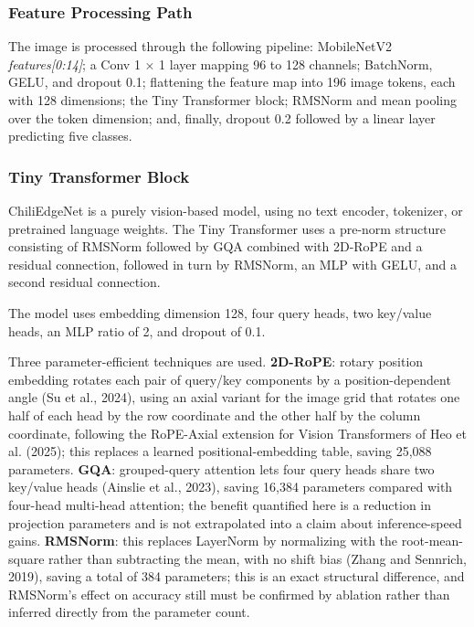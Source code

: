 \subsubsection{Feature Processing Path}\label{feature-processing-path}

The image is processed through the following pipeline: MobileNetV2 \emph{features{[}0:14{]}}; a Conv 1 × 1 layer mapping 96 to 128 channels; BatchNorm, GELU, and dropout 0.1; flattening the feature map into 196 image tokens, each with 128 dimensions; the Tiny Transformer block; RMSNorm and mean pooling over the token dimension; and, finally, dropout 0.2 followed by a linear layer predicting five classes.

\subsubsection{Tiny Transformer Block}\label{tiny-transformer-block}

ChiliEdgeNet is a purely vision-based model, using no text encoder, tokenizer, or pretrained language weights. The Tiny Transformer uses a pre-norm structure consisting of RMSNorm followed by GQA combined with 2D-RoPE and a residual connection, followed in turn by RMSNorm, an MLP with GELU, and a second residual connection.

The model uses embedding dimension 128, four query heads, two key/value heads, an MLP ratio of 2, and dropout of 0.1.

Three parameter-efficient techniques are used. \textbf{2D-RoPE}: rotary position embedding rotates each pair of query/key components by a position-dependent angle (Su et al., 2024), using an axial variant for the image grid that rotates one half of each head by the row coordinate and the other half by the column coordinate, following the RoPE-Axial extension for Vision Transformers of Heo et al. (2025); this replaces a learned positional-embedding table, saving 25,088 parameters. \textbf{GQA}: grouped-query attention lets four query heads share two key/value heads (Ainslie et al., 2023), saving 16,384 parameters compared with four-head multi-head attention; the benefit quantified here is a reduction in projection parameters and is not extrapolated into a claim about inference-speed gains. \textbf{RMSNorm}: this replaces LayerNorm by normalizing with the root-mean-square rather than subtracting the mean, with no shift bias (Zhang and Sennrich, 2019), saving a total of 384 parameters; this is an exact structural difference, and RMSNorm's effect on accuracy still must be confirmed by ablation rather than inferred directly from the parameter count.

